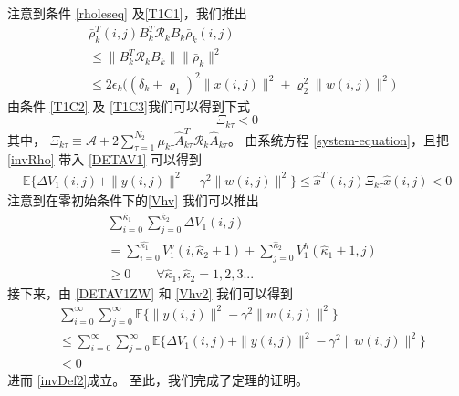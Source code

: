 	注意到条件 \eqref{rholeseq} 及\eqref{T1C1}，我们推出
	\begin{equation}\label{invRho}
	\begin{split}
	&\bar{\rho}^{T}_{k}(i,j)B^{T}_{k}\mathcal{R}_{k}B_{k}\bar{\rho}_{k}(i,j)\\
	&\leq \|B^{T}_{k}\mathcal{R}_{k}B_{k}\|\|\bar{\rho}_{k}\|^{2} \\
	&\leq 2\epsilon_{k}\big((\delta_{k}+\varrho_{1})^{2}\|x(i,j)\|^{2}+\varrho_{2}^{2}\|w(i,j)\|^{2} \big)
	\end{split}
	\end{equation} 
	由条件 \eqref{T1C2} 及 \eqref{T1C3}我们可以得到下式
	\begin{equation}\label{T1P4}
	\mathcal{\varXi}_{k\tau }<0
	\end{equation}	
	其中， $\mathcal{\varXi}_{k\tau } \equiv \mathcal{A} +2\sum_{\tau =1}^{N_{2}}\mu_{k\tau }\hat{A}^{T}_{k\tau }\mathcal{R}_{k}\hat{A}_{k\tau }$。
	由系统方程 \eqref{system-equation}，且把\eqref{invRho} 带入 \eqref{DETAV1} 可以得到
	\begin{equation}\label{DETAV1ZW}
	\begin{split}
	\mathbb{E}\{\varDelta V_{1}(i,j)+\|y(i,j)\|^{2}-\gamma^{2}\|w(i,j)\|^{2}  \} \leq \hat{x}^{T}(i,j)\mathcal{\varXi}_{k\tau } \hat{x}(i,j)<0
	\end{split}
	\end{equation}
	注意到在零初始条件下的\eqref{Vhv} 我们可以推出
	\begin{equation} \label{Vhv2}
	\begin{split}
	&\sum_{i=0}^{\hat{\kappa}_{1}}\sum_{j=0}^{\hat{\kappa}_{2}}  \varDelta V_{1}(i,j)\\
	&=\sum_{i=0}^{\hat{\kappa_{1}}}V^{v}_{1}(i,\hat{\kappa}_{2}+1) + \sum_{j=0}^{\hat{\kappa}_{2}}V^{h}_{1}(\hat{\kappa}_{1}+1,j) \\
	&\geq 0 \qquad \forall \hat{\kappa}_{1},\hat{\kappa}_{2} = 1,2,3...
	\end{split}
	\end{equation}
	接下来，由 \eqref{DETAV1ZW} 和 \eqref{Vhv2} 我们可以得到 
	\begin{equation}\label{DETAV1ZW2}
	\begin{split}
	&\sum_{i=0}^{\infty}\sum_{j=0}^{\infty}  \mathbb{E}\{\|y(i,j)\|^{2}-\gamma^{2}\|w(i,j)\|^{2}  \}\\
	&\leq \sum_{i=0}^{\infty}\sum_{j=0}^{\infty}  \mathbb{E}\{\varDelta V_{1}(i,j)+\|y(i,j)\|^{2}-\gamma^{2}\|w(i,j)\|^{2}  \}  \\
	&< 0
	\end{split}
	\end{equation}
	进而 \eqref{invDef2}成立。 至此，我们完成了定理的证明。
	
